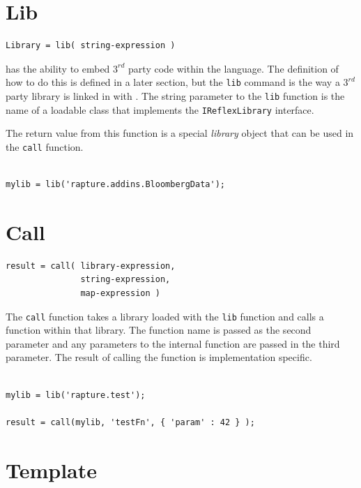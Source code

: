 \section{Lib}

\begin{verbatim}
Library = lib( string-expression )
\end{verbatim}

\Reflex has the ability to embed $3^{rd}$ party code within the language. The definition of how to do this is defined in a later section, but the \verb+lib+ command is the way a $3^{rd}$ party library is linked in with \Reflex. The string parameter to the \verb+lib+ function is the name of a loadable class that implements the \verb+IReflexLibrary+ interface.

The return value from this function is a special \emph{library} object that can be used in the \verb+call+ function.

\begin{lstlisting}[caption={Lib example}]

mylib = lib('rapture.addins.BloombergData');

\end{lstlisting}

\section{Call}

\begin{verbatim}
result = call( library-expression, 
               string-expression, 
               map-expression )
\end{verbatim}

The \verb+call+ function takes a library loaded with the \verb+lib+ function and calls a function within that library. The function name is passed as the second parameter and any parameters to the internal function are passed in the third parameter. The result of calling the function is implementation specific.

\begin{lstlisting}[caption={Call example}]

mylib = lib('rapture.test');

result = call(mylib, 'testFn', { 'param' : 42 } );

\end{lstlisting}

\section{Template}

